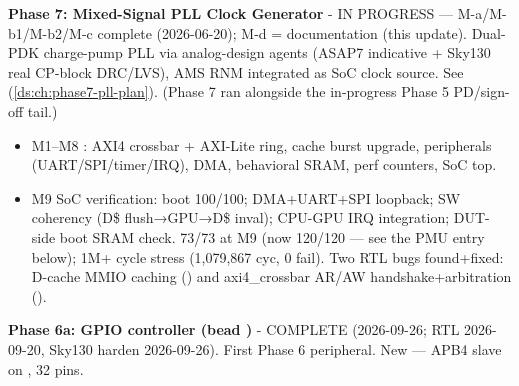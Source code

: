 \begin{record}
\textbf{Phase 7: Mixed-Signal PLL Clock Generator} - \wip{} IN PROGRESS
--- M-a/\allowbreak{}M-b1/\allowbreak{}M-b2/\allowbreak{}M-c \ok{}
complete (2026-06-20); M-d = documentation (this update). Dual-PDK
charge-pump PLL via analog-design agents (ASAP7 indicative + Sky130 real
CP-block DRC/LVS), AMS RNM integrated as SoC clock source. See
 (\cref{ds:ch:phase7-pll-plan}). (Phase 7 ran alongside the
in-progress Phase 5 PD/\allowbreak{}sign-off tail.)

\begin{itemize}
\tightlist
\item
  M1--M8 \ok{}: AXI4 crossbar + AXI-Lite ring, cache burst upgrade,
  peripherals
  (UART/\allowbreak{}SPI/\allowbreak{}timer/\allowbreak{}IRQ), DMA,
  behavioral SRAM, perf counters, SoC top.
\item
  M9 \ok{} SoC verification: boot 100/100; DMA+UART+SPI loopback; SW
  coherency (D\$ flush→GPU→D\$ inval); CPU-GPU IRQ integration; DUT-side
  boot SRAM check.  73/73 at M9 (now 120/120 --- see the
  PMU entry below); 1M+ cycle stress (1,079,867 cyc, 0 fail). Two RTL
  bugs found+fixed: D-cache MMIO caching () and
  axi4\_\allowbreak{}crossbar AR/AW handshake+arbitration ().
\end{itemize}

\textbf{Phase 6a: GPIO controller (bead )} - \ok{} COMPLETE
(2026-09-26; RTL 2026-09-20, Sky130 harden 2026-09-26). First Phase 6
peripheral. New  --- APB4 slave on
, 32 pins.


\end{record}
